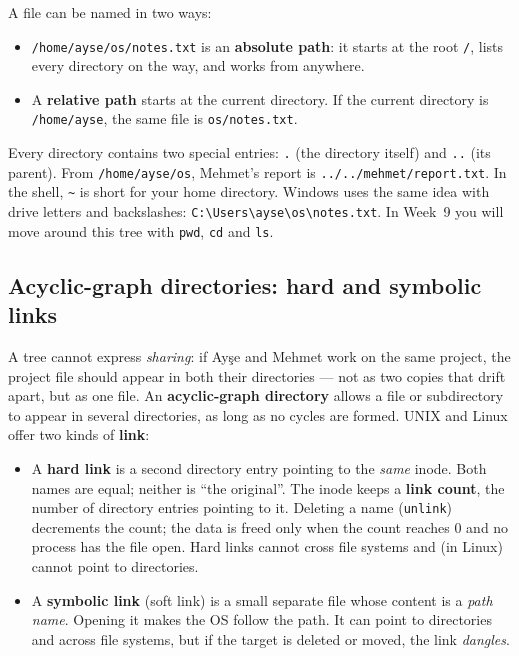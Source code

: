 \documentclass[11pt,a4paper]{article}
\newcommand{\term}[1]{\textbf{\color{mintdeep}#1}}
\newcommand{\cmd}[1]{\texttt{#1}}
\begin{document}
A file can be named in two ways:
\begin{itemize}
  \item \texttt{/home/ayse/os/notes.txt} is an \term{absolute path}: it starts at the root \texttt{/}, lists every directory on the way, and works from anywhere.
  \item A \term{relative path} starts at the current directory. If the current directory is \texttt{/home/ayse}, the same file is \texttt{os/notes.txt}.
\end{itemize}
Every directory contains two special entries: \texttt{.} (the directory itself) and \texttt{..} (its parent). From \texttt{/\allowbreak{}home/\allowbreak{}ayse/\allowbreak{}os}, Mehmet's report is \texttt{../\allowbreak{}../\allowbreak{}mehmet/\allowbreak{}report.txt}. In the shell, \texttt{\textasciitilde} is short for your home directory. Windows uses the same idea with drive letters and backslashes: \texttt{C:\textbackslash{}Users\textbackslash{}ayse\textbackslash{}os\textbackslash{}notes.txt}. In Week~9 you will move around this tree with \cmd{pwd}, \cmd{cd} and \cmd{ls}.

\subsection{Acyclic-graph directories: hard and symbolic links}
\label{sec:acyclic}

A tree cannot express \emph{sharing}: if Ayşe and Mehmet work on the same project, the project file should appear in both their directories --- not as two copies that drift apart, but as one file. An \term{acyclic-graph directory} allows a file or subdirectory to appear in several directories, as long as no cycles are formed. UNIX and Linux offer two kinds of \term{link}:

\begin{itemize}
  \item A \term{hard link} is a second directory entry pointing to the \emph{same} inode. Both names are equal; neither is ``the original''. The inode keeps a \term{link count}, the number of directory entries pointing to it. Deleting a name (\cmd{unlink}) decrements the count; the data is freed only when the count reaches $0$ and no process has the file open. Hard links cannot cross file systems and (in Linux) cannot point to directories.
  \item A \term{symbolic link} (soft link) is a small separate file whose content is a \emph{path name}. Opening it makes the OS follow the path. It can point to directories and across file systems, but if the target is deleted or moved, the link \emph{dangles}.
\end{itemize}
\end{document}
